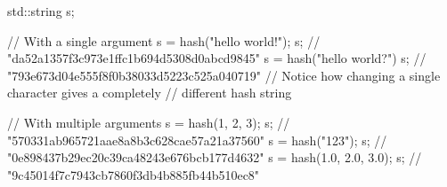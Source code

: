 \begin{example}
\begin{cppcode}
std::string s;

// With a single argument
s = hash("hello world!");
s; // "da52a1357f3c973e1ffc1b694d5308d0abcd9845"
s = hash("hello world?")
s; // "793e673d04e555f8f0b38033d5223c525a040719"
// Notice how changing a single character gives a completely
// different hash string

// With multiple arguments
s = hash(1, 2, 3);
s; // "570331ab965721aae8a8b3c628cae57a21a37560"
s = hash("123");
s; // "0e898437b29ec20c39ca48243e676bcb177d4632"
s = hash(1.0, 2.0, 3.0);
s; // "9c45014f7c7943cb7860f3db4b885fb44b510ec8"
\end{cppcode}
\end{example}
